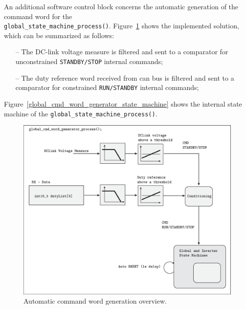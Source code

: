 \documentclass[11pt,a4paper,oneside]{book}
\numberwithin{equation}{section}
\theoremstyle{it}
\theoremstyle{definition}
\begin{document}
An additional software control block concerns the automatic generation of the command word for the \\ {\selectfont \verb+global_state_machine_process()+}.  
Figure~\ref{global_cmd_word_generator_process} shows the implemented solution, which can be summarized as follows:
\begin{itemize}
	\item[--] The DC-link voltage measure is filtered and sent to a comparator for unconstrained {\selectfont \verb+STANDBY/STOP+} internal commands;
	\item[--] The duty reference word received from can bus is filtered and sent to a comparator for constrained {\selectfont \verb+RUN/STANDBY+} internal commands;	
\end{itemize}
Figure~\ref{global_cmd_word_generator_state_machine} shows the internal state machine of the {\selectfont \verb+global_state_machine_process()+}.
\begin{figure}[H]
	\centering
	\includegraphics[width= 450pt, angle = 0, 
	keepaspectratio]{figures/firmware_arch/global_cmd_word_generator_process.eps}
	\captionsetup{width=0.5\textwidth, font=small}	
	\caption{Automatic command word generation overview.}
	\label{global_cmd_word_generator_process}
\end{figure}
\end{document}
